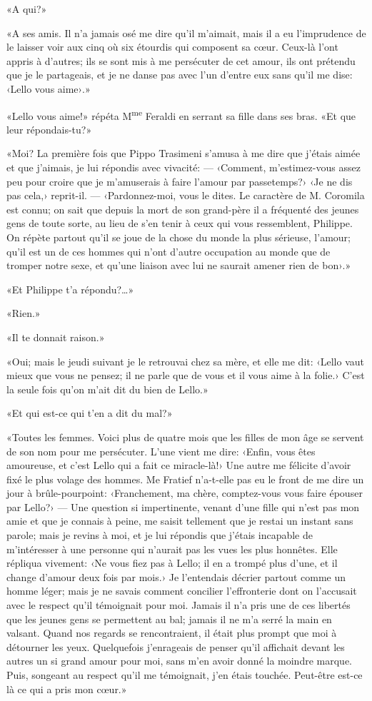«A qui?»

«A ses amis. Il n'a jamais osé me dire qu'il m'aimait, mais il a eu
l'imprudence de le laisser voir aux cinq où six étourdis qui composent
sa cœur. Ceux-là l'ont appris à d'autres; ils se sont mis à me
persécuter de cet amour, ils ont prétendu que je le partageais, et je ne
danse pas avec l'un d'entre eux sans qu'il me dise: ‹Lello vous aime›.»

«Lello vous aime!» répéta M\textsuperscript{me} Feraldi en serrant
sa fille dans ses bras. «Et que leur répondais-tu?»

«Moi? La première fois que Pippo Trasimeni s'amusa à me dire que
j'étais aimée et que j'aimais, je lui répondis avec vivacité: ---
‹Comment, m'estimez-vous assez peu pour croire que je m'amuserais à
faire l'amour par passetemps?› ‹Je ne dis pas cela,› reprit-il. ---
‹Pardonnez-moi, vous le dites. Le caractère de M. Coromila est connu; on
sait que depuis la mort de son grand-père il a fréquenté des jeunes gens
de toute sorte, au lieu de s'en tenir à ceux qui vous ressemblent,
Philippe. On répète partout qu'il se joue de la chose du monde la plus
sérieuse, l'amour; qu'il est un de ces hommes qui n'ont d'autre
occupation au monde que de tromper notre sexe, et qu'une liaison avec
lui ne saurait amener rien de bon›.»

«Et Philippe t'a répondu?\ldots»

«Rien.»

«Il te donnait raison.»

«Oui; mais le jeudi suivant je le retrouvai chez sa mère, et elle me
dit: ‹Lello vaut mieux que vous ne pensez; il ne parle que de vous et il
vous aime à la folie.› C'est la seule fois qu'on m'ait dit du bien de
Lello.»

«Et qui est-ce qui t'en a dit du mal?»

«Toutes les femmes. Voici plus de quatre mois que les filles de mon
âge se servent de son nom pour me persécuter. L'une vient me dire:
‹Enfin, vous êtes amoureuse, et c'est Lello qui a fait ce miracle-là!›
Une autre me félicite d'avoir fixé le plus volage des hommes. Me Fratief
n'a-t-elle pas eu le front de me dire un jour à brûle-pourpoint:
‹Franchement, ma chère, comptez-vous vous faire épouser par Lello?› ---
Une question si impertinente, venant d'une fille qui n'est pas mon amie
et que je connais à peine, me saisit tellement que je restai un instant
sans parole; mais je revins à moi, et je lui répondis que j'étais
incapable de m'intéresser à une personne qui n'aurait pas les vues les
plus honnêtes. Elle répliqua vivement: ‹Ne vous fiez pas à Lello; il en
a trompé plus d'une, et il change d'amour deux fois par mois.› Je
l'entendais décrier partout comme un homme léger; mais je ne savais
comment concilier l'effronterie dont on l'accusait avec le respect qu'il
témoignait pour moi. Jamais il n'a pris une de ces libertés que les
jeunes gens se permettent au bal; jamais il ne m'a serré la main en
valsant. Quand nos regards se rencontraient, il était plus prompt que
moi à détourner les yeux. Quelquefois j'enrageais de penser qu'il
affichait devant les autres un si grand amour pour moi, sans m'en avoir
donné la moindre marque. Puis, songeant au respect qu'il me témoignait,
j'en étais touchée. Peut-être est-ce là ce qui a pris mon cœur.»

